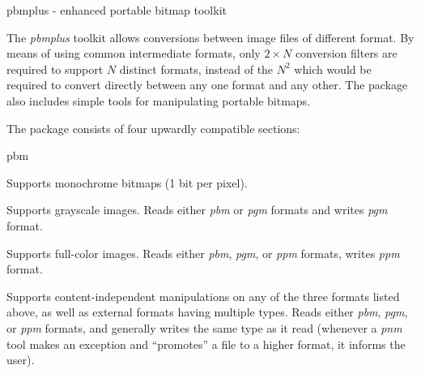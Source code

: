 

%
%

pbmplus - enhanced portable bitmap toolkit

The {\it pbmplus} toolkit allows conversions between image files of
different format.  By means of using common intermediate formats, only
$2 \times N$ conversion filters are required to support $N$ distinct formats,
instead of the $N^2$ which would be required to convert directly between
any one format and any other.  The package also includes simple tools for
manipulating portable bitmaps.

The package consists of four upwardly compatible sections:
\begin{TPlist}{pbm}
\item[{pbm}]
Supports monochrome bitmaps (1 bit per pixel).
\item[{pgm}]
Supports grayscale images.  Reads either {\it pbm} or {\it pgm} formats
and writes {\it pgm} format.
\item[{ppm}]
Supports full-color images.  Reads either {\it pbm}, {\it pgm}, or {\it
ppm} formats, writes {\it ppm} format.
\item[{pnm}]
Supports content-independent manipulations on any of the three formats
listed above, as well as external formats having multiple types.  Reads
either {\it pbm}, {\it pgm}, or {\it ppm} formats, and generally writes
the same type as it read (whenever a {\it pnm} tool makes an exception
and ``promotes'' a file to a higher format, it informs the user).
\end{TPlist}

